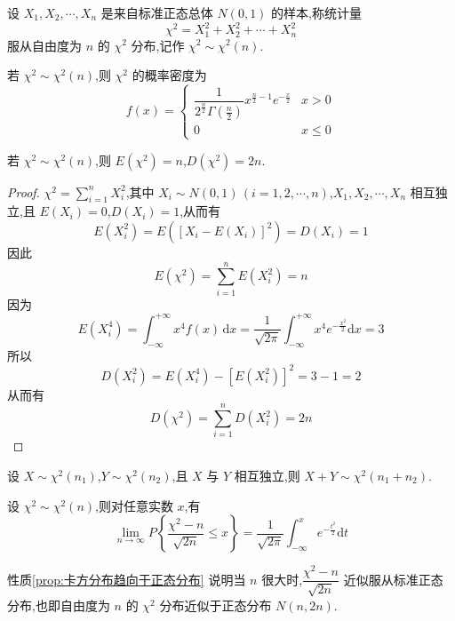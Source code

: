 \begin{definition} \label{def:卡方分布}
    设 $X_1, X_2, \cdots, X_n$ 是来自标准正态总体 $N(0,1)$ 的样本,称统计量
    $$
    \chi^2 = X_1^2 + X_2^2 + \cdots + X_n^2
    $$
    服从自由度为 $n$ 的 $\chi^2$ 分布,记作 $\chi^2 \sim \chi^2(n)$.
\end{definition}

若 $\chi^2 \sim \chi^2(n)$,则 $\chi^2$ 的概率密度为
$$
f(x) = \begin{cases}
    \dfrac{1}{2^{\frac{n}{2}} \Gamma(\frac{n}{2})} x^{\frac{n}{2} - 1} e^{-\frac{x}{2}} & x>0 \\
    0 & x \leqslant 0
\end{cases}
$$

\begin{property} \label{prop:卡方分布的数学期望和方差}
    若 $\chi^2 \sim \chi^2(n)$,则 $E(\chi^2) = n$,$D(\chi^2) = 2n$.
\end{property}

\begin{proof}
    $\chi^2 = \displaystyle\sum_{i=1}^n X_i^2$,其中 $X_i \sim N(0,1) \, (i=1,2,\cdots,n)$,$X_1, X_2, \cdots, X_n$ 相互独立,且 $E(X_i) = 0$,$D(X_i) = 1$,从而有
    $$
    E(X_i^2) = E([X_i - E(X_i)]^2) = D(X_i) = 1
    $$
    因此
    $$
    E(\chi^2) = \sum_{i=1}^n E(X_i^2) = n
    $$
    因为
    $$
    E(X_i^4) = \int_{-\infty}^{+\infty} x^4 f(x) \, \text{d}x = \dfrac{1}{\sqrt{2 \pi}} \int_{-\infty}^{+\infty} x^4 e^{-\frac{x^2}{2}} \text{d}x = 3
    $$
    所以
    $$
    D(X_i^2) = E(X_i^4) - [E(X_i^2)]^2 = 3-1 = 2
    $$
    从而有
    $$
    D(\chi^2) = \sum_{i=1}^n D(X_i^2) = 2n
    $$
\end{proof}

\begin{property}[][可加性]
    设 $X \sim \chi^2(n_1)$,$Y \sim \chi^2(n_2)$,且 $X$ 与 $Y$ 相互独立,则 $X+Y \sim \chi^2(n_1 + n_2)$.
\end{property}

\begin{property} \label{prop:卡方分布趋向于正态分布}
    设 $\chi^2 \sim \chi^2(n)$,则对任意实数 $x$,有
    $$
    \lim_{n \to \infty} P \left\{ \dfrac{\chi^2 - n}{\sqrt{2n}} \leqslant x \right\} = \dfrac{1}{\sqrt{2 \pi}} \int_{-\infty}^{x} e^{-\frac{t^2}{2}} \text{d}t
    $$
\end{property}

性质\ref*{prop:卡方分布趋向于正态分布} 说明当 $n$ 很大时,$\dfrac{\chi^2 - n}{\sqrt{2n}}$ 近似服从标准正态分布,也即自由度为 $n$ 的 $\chi^2$ 分布近似于正态分布 $N(n,2n)$.

